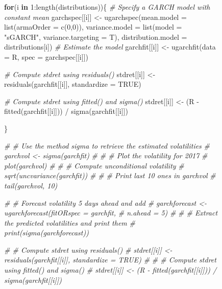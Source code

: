 \documentclass[a4paper,nobind]{templates/ociamthesis}
\newenvironment{Shaded}{\begin{snugshade}}{\end{snugshade}}
\newcommand{\AttributeTok}[1]{\textcolor[rgb]{0.77,0.63,0.00}{#1}}
\newcommand{\CommentTok}[1]{\textcolor[rgb]{0.56,0.35,0.01}{\textit{#1}}}
\newcommand{\ConstantTok}[1]{\textcolor[rgb]{0.00,0.00,0.00}{#1}}
\newcommand{\ControlFlowTok}[1]{\textcolor[rgb]{0.13,0.29,0.53}{\textbf{#1}}}
\newcommand{\DecValTok}[1]{\textcolor[rgb]{0.00,0.00,0.81}{#1}}
\newcommand{\FunctionTok}[1]{\textcolor[rgb]{0.00,0.00,0.00}{#1}}
\newcommand{\NormalTok}[1]{#1}
\newcommand{\OtherTok}[1]{\textcolor[rgb]{0.56,0.35,0.01}{#1}}
\newcommand{\SpecialCharTok}[1]{\textcolor[rgb]{0.00,0.00,0.00}{#1}}
\newcommand{\StringTok}[1]{\textcolor[rgb]{0.31,0.60,0.02}{#1}}
\renewenvironment{Shaded}
{
  \vspace{10pt}%
  \begin{snugshade}%
}{%
  \end{snugshade}%
  \vspace{8pt}%
}
\begin{document}
\begin{figure}[h]
\begin{Shaded}
\begin{Highlighting}[]
\ControlFlowTok{for}\NormalTok{(i }\ControlFlowTok{in} \DecValTok{1}\SpecialCharTok{:}\FunctionTok{length}\NormalTok{(distributions))\{}
\CommentTok{\# Specify a GARCH model with constant mean}
\NormalTok{garchspec[[i]] }\OtherTok{\textless{}{-}} \FunctionTok{ugarchspec}\NormalTok{(}\AttributeTok{mean.model =} \FunctionTok{list}\NormalTok{(}\AttributeTok{armaOrder =} \FunctionTok{c}\NormalTok{(}\DecValTok{0}\NormalTok{,}\DecValTok{0}\NormalTok{)),}
                     \AttributeTok{variance.model =} \FunctionTok{list}\NormalTok{(}\AttributeTok{model =} \StringTok{"sGARCH"}\NormalTok{, }\AttributeTok{variance.targeting =}\NormalTok{ T), }
                     \AttributeTok{distribution.model =}\NormalTok{ distributions[i])}
\CommentTok{\# Estimate the model}
\NormalTok{garchfit[[i]] }\OtherTok{\textless{}{-}} \FunctionTok{ugarchfit}\NormalTok{(}\AttributeTok{data =}\NormalTok{ R, }\AttributeTok{spec =}\NormalTok{ garchspec[[i]])}

\CommentTok{\# Compute stdret using residuals()}
\NormalTok{stdret[[i]] }\OtherTok{\textless{}{-}} \FunctionTok{residuals}\NormalTok{(garchfit[[i]], }\AttributeTok{standardize =} \ConstantTok{TRUE}\NormalTok{)}

\CommentTok{\# Compute stdret using fitted() and sigma()}
\NormalTok{stdret[[i]] }\OtherTok{\textless{}{-}}\NormalTok{ (R }\SpecialCharTok{{-}} \FunctionTok{fitted}\NormalTok{(garchfit[[i]])) }\SpecialCharTok{/} \FunctionTok{sigma}\NormalTok{(garchfit[[i]]) }

\NormalTok{\}}


\CommentTok{\# \# Use the method sigma to retrieve the estimated volatilities }
\CommentTok{\# garchvol \textless{}{-} sigma(garchfit) }
\CommentTok{\# }
\CommentTok{\# \# Plot the volatility for 2017}
\CommentTok{\# plot(garchvol)}
\CommentTok{\# }
\CommentTok{\# \# Compute unconditional volatility}
\CommentTok{\# sqrt(uncvariance(garchfit))}
\CommentTok{\# }
\CommentTok{\# \# Print last 10 ones in garchvol}
\CommentTok{\# tail(garchvol, 10)}

\CommentTok{\# \# Forecast volatility 5 days ahead and add }
\CommentTok{\# garchforecast \textless{}{-} ugarchforecast(fitORspec = garchfit, }
\CommentTok{\#                      n.ahead = 5)}
\CommentTok{\# }
\CommentTok{\# \# Extract the predicted volatilities and print them}
\CommentTok{\# print(sigma(garchforecast))}




\CommentTok{\# \# Compute stdret using residuals()}
\CommentTok{\# stdret[[i]] \textless{}{-} residuals(garchfit[[i]], standardize = TRUE)}
\CommentTok{\# }
\CommentTok{\# \# Compute stdret using fitted() and sigma()}
\CommentTok{\# stdret[[i]] \textless{}{-} (R {-} fitted(garchfit[[i]])) / sigma(garchfit[[i]])}







\end{Highlighting}
\end{Shaded}
\end{figure}
\end{document}

